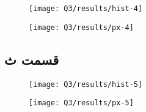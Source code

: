 \documentclass[12pt,onecolumn,a4paper]{article}
\theoremstyle{definition}
\begin{document}
		
	\begin{figure}[H]
		\centering
		\texttt{[image: Q3/results/hist-4]}
		\caption{}
		\label{fig:hist-4}
	\end{figure}


		
	\begin{figure}[H]
		\centering
		\texttt{[image: Q3/results/px-4]}
		\caption{}
		\label{fig:px-4}
	\end{figure}

	
	\FloatBarrier
	\subsection{قسمت ث}

		
	\begin{figure}[H]
		\centering
		\texttt{[image: Q3/results/hist-5]}
		\caption{}
		\label{fig:hist-5}
	\end{figure}


		
	\begin{figure}[H]
		\centering
		\texttt{[image: Q3/results/px-5]}
		\caption{}
		\label{fig:px-5}
	\end{figure}
	
	\newpage
	
	
	
	
\end{document}
